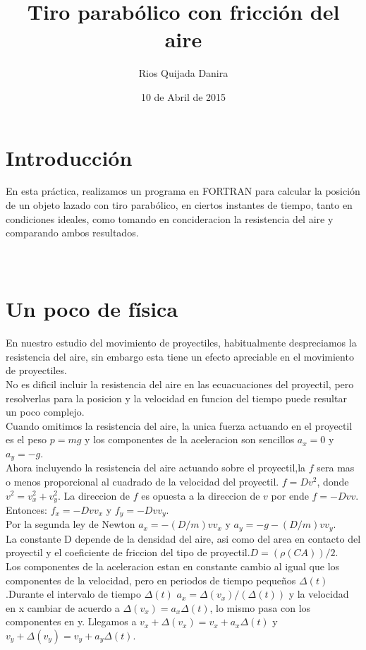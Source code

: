 \documentclass[10pt]{article}
\title{Tiro parabólico con fricción del aire}
\author{Rios Quijada Danira}
\date{10 de Abril de 2015}
\begin{document}
\maketitle
\section{Introducción}
En esta práctica, realizamos un programa en FORTRAN para calcular la posición de un objeto lazado con tiro parabólico, en ciertos instantes de tiempo, tanto en condiciones ideales, como tomando en concideracion la resistencia del aire y comparando ambos resultados.
\\
\\
\\
\section{Un poco de física}
En nuestro estudio del movimiento de proyectiles, habitualmente despreciamos la resistencia del aire, sin embargo esta tiene un efecto apreciable en el movimiento de proyectiles.\\

No es dificil incluir la resistencia del aire en las ecuacuaciones del proyectil, pero resolverlas para la posicion y la velocidad en funcion del tiempo puede resultar un poco complejo.\\

Cuando omitimos la resistencia del aire, la unica fuerza actuando en el proyectil es el peso $p=mg$ y los componentes de la aceleracion son sencillos $a_{x}=0$ y $a_{y}=-g$.\\

Ahora incluyendo la resistencia del aire actuando sobre el proyectil,la $f$ sera mas o menos proporcional  al cuadrado de la velocidad del proyectil. $f=Dv^2$, donde $v^2=v_{x}^2+v_{y}^2$. La direccion de $f$ es opuesta a la direccion de $v$ por ende $f=-Dvv$. Entonces: $f_{x}=-Dvv_{x}$ y $f_{y}=-Dvv_{y}$.\\

Por la segunda ley de Newton $a_{x}=-(D/m)vv_{x}$ y $a_{y}=-g-(D/m)vv_{y}$.\\

La constante D depende de la densidad del aire, asi como del area en contacto del proyectil y el coeficiente de friccion del tipo de proyectil.$D=(\rho(CA))/2$.\\

Los componentes de la aceleracion estan en constante cambio al igual que los componentes de la velocidad, pero en periodos de tiempo pequeños $\Delta(t)$.Durante el intervalo de tiempo $\Delta(t)$ $a_{x}=\Delta(v_{x})/(\Delta(t))$ y la velocidad en x cambiar de acuerdo a $\Delta(v_{x})=a_{x}\Delta(t)$, lo mismo pasa con los componentes en y. Llegamos a  $v_{x}+\Delta(v_{x})=v_{x}+a_{x}\Delta(t)$ y $v_{y}+\Delta(v_{y})=v_{y}+a_{y}\Delta(t)$.\\
\end{document}
